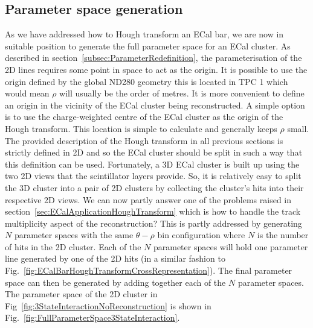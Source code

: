 \subsection{Parameter space generation}
\label{subsec:ParameterSpaceGeneration}
As we have addressed how to Hough transform an ECal bar, we are now in suitable position to generate the full parameter space for an ECal cluster.  As described in section~\ref{subsec:ParameterRedefinition}, the parameterisation of the 2D lines requires some point in space to act as the origin.  It is possible to use the origin defined by the global ND280 geometry this is located in TPC 1 which would mean $\rho$ will usually be the order of metres.  It is more convenient to define an origin in the vicinity of the ECal cluster being reconstructed.  A simple option is to use the charge-weighted centre of the ECal cluster as the origin of the Hough transform.  This location is simple to calculate and generally keeps $\rho$ small.
\newline
\newline
The provided description of the Hough transform in all previous sections is strictly defined in 2D and so the ECal cluster should be split in such a way that this definition can be used.  Fortunately, a 3D ECal cluster is built up using the two 2D views that the scintillator layers provide.  So, it is relatively easy to split the 3D cluster into a pair of 2D clusters by collecting the cluster's hits into their respective 2D views.
\newline
\newline
We can now partly answer one of the problems raised in section~\ref{sec:ECalApplicationHoughTransform} which is how to handle the track multiplicity aspect of the reconstruction?  This is partly addressed by generating $N$ parameter spaces with the same $\theta-\rho$ bin configuration where $N$ is the number of hits in the 2D cluster.  Each of the $N$ parameter spaces will hold one parameter line generated by one of the 2D hits (in a similar fashion to Fig.~\ref{fig:ECalBarHoughTransformCrossRepresentation}).  The final parameter space can then be generated by adding together each of the $N$ parameter spaces.  The parameter space of the 2D cluster in Fig~\ref{fig:3StateInteractionNoReconstruction} is shown in Fig.~\ref{fig:FullParameterSpace3StateInteraction}.
